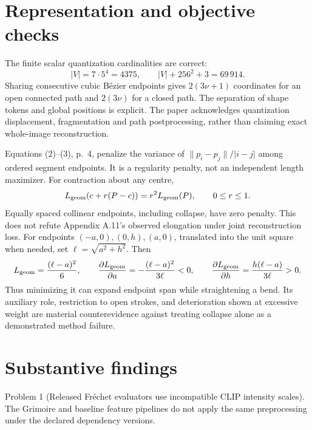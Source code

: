 \documentclass[10pt]{article}
\begin{document}
\section*{Representation and objective checks}
The finite scalar quantization cardinalities are correct: \[|V|=7\cdot5^4=4375,\qquad |V|+256^2+3=69\,914.\] Sharing consecutive cubic Bézier endpoints gives \(2(3\nu+1)\) coordinates for an open connected path and \(2(3\nu)\) for a closed path. The separation of shape tokens and global positions is explicit. The paper acknowledges quantization displacement, fragmentation and path postprocessing, rather than claiming exact whole-image reconstruction.\par
Equations (2)–(3), p. 4, penalize the variance of \(\|p_i-p_j\|/|i-j|\) among ordered segment endpoints. It is a regularity penalty, not an independent length maximizer. For contraction about any centre, \[L_{\rm geom}(c+r(P-c))=r^2L_{\rm geom}(P),\qquad 0\leq r\leq1.\] Equally spaced collinear endpoints, including collapse, have zero penalty. This does not refute Appendix A.11’s observed elongation under joint reconstruction loss. For endpoints \((-a,0),(0,h),(a,0)\), translated into the unit square when needed, set \(\ell=\sqrt{a^2+h^2}\). Then \[L_{\rm geom}=\frac{(\ell-a)^2}{6},\qquad
 \frac{\partial L_{\rm geom}}{\partial a}
 =-\frac{(\ell-a)^2}{3\ell}<0,\qquad
 \frac{\partial L_{\rm geom}}{\partial h}
 =\frac{h(\ell-a)}{3\ell}>0.\] Thus minimizing it can expand endpoint span while straightening a bend. Its auxiliary role, restriction to open strokes, and deterioration shown at excessive weight are material counterevidence against treating collapse alone as a demonstrated method failure.\par
\section*{Substantive findings}
Problem 1 (Released Fréchet evaluators use incompatible CLIP intensity scales).  The Grimoire and baseline feature pipelines do not apply the same preprocessing under the declared dependency versions.\par
\end{document}

